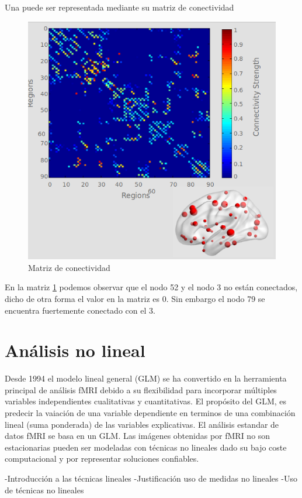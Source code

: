 Una puede ser representada mediante su matriz de conectividad

	\begin{figure}[H]
  		\centering
    	\includegraphics[scale=0.5]{img/matrix_conect.png}
  		\caption{Matriz de conectividad}         \label{preproc:matrix_conect}
	\end{figure}
	
En la matriz \ref{preproc:matrix_conect} podemos observar que el nodo 52 y el nodo 3 no están conectados, dicho de otra forma el valor en la matriz es 0. Sin embargo el nodo 79 se encuentra fuertemente conectado con el 3.

\section{Análisis no lineal}

 Desde 1994 el modelo lineal general (GLM) se ha convertido en la herramienta principal de análisis fMRI debido a su flexibilidad para incorporar múltiples variables independientes cualitativas y cuantitativas. El propósito del GLM, es predecir la vaiación de una variable dependiente en terminos de una combinación lineal (suma ponderada) de las variables explicativas. El análisis estandar de datos fMRI se basa en un GLM.
 Las imágenes obtenidas por fMRI no son estacionarias pueden ser modeladas con técnicas no lineales dado su bajo coste computacional y por representar soluciones confiables. 

-Introducción a las técnicas lineales
-Justificación uso de medidas no lineales
-Uso de técnicas no lineales
